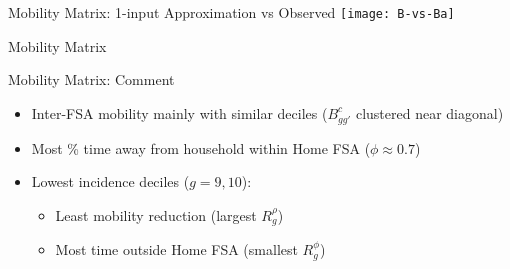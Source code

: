 \begin{frame}{Mobility Matrix: 1-input Approximation vs Observed}
  \centering
  \texttt{[image: B-vs-Ba]}
\end{frame}
\begin{frame}{Mobility Matrix }
  \centering
\end{frame}
\begin{frame}{Mobility Matrix: Comment}
  \begin{itemize}
    \item Inter-FSA mobility mainly with similar deciles
          ($B^c_{gg'}$ clustered near diagonal)\smallpar
    \item Most \% time away from household within Home FSA
          ($\phi \approx 0.7$)\smallpar
    \item Lowest incidence deciles ($g = 9,10$):\smallpar
    \begin{itemize}
      \item Least mobility reduction (largest $R^{\rho}_{g}$)\smallpar
      \item Most time outside Home FSA (smallest $R^{\phi}_{g}$)\smallpar
    \end{itemize}
  \end{itemize}
\end{frame}
